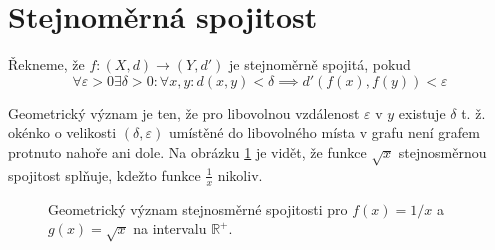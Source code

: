 \documentclass[../main.tex]{subfiles}
\begin{document}
\section{Stejnoměrná spojitost}
\begin{definition}
	Řekneme, že $f : (X,d) \rightarrow (Y,d')$ je stejnoměrně spojitá, pokud
	\[\forall \varepsilon > 0 \exists \delta > 0 : \forall x,y : d(x,y) < \delta \implies d'(f(x),f(y)) < \varepsilon\]
\end{definition}

\begin{intuition}
	Geometrický význam je ten, že pro libovolnou vzdálenost \(\varepsilon\) v \(y\) existuje \(\delta\) t. ž. okénko o velikosti \((\delta, \varepsilon)\) umístěné do libovolného místa v grafu není grafem protnuto nahoře ani dole. Na obrázku \ref{fig:con} je vidět, že funkce \(\sqrt{x}\) stejnosměrnou spojitost splňuje, kdežto funkce \(\frac{1}{x}\) nikoliv.

	\begin{figure}[h]
		\centering
		\hspace{3em}
		\hspace{3em}
		\caption{Geometrický význam stejnosměrné spojitosti pro \(f(x) = 1/x\) a \(g(x) = \sqrt{x}\) na intervalu \(\mathbb{R}^+\).}
		\label{fig:con}
	\end{figure}
\end{intuition}
\end{document}
